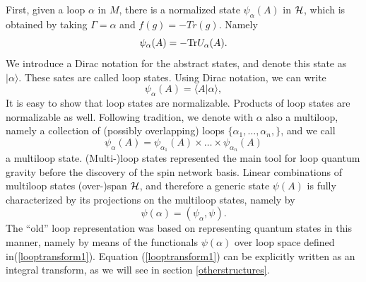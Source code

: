 \documentclass[12pt]{article}
\begin{document}
First, given a loop $\alpha$ in $M$, there is a normalized state 
$\psi_{\alpha}(A)$ in $\cal H$, which is obtained by taking 
$\Gamma=\alpha$ and $f(g)=-Tr(g)$.  Namely
\begin{equation}
	\psi_{\alpha}(A) = - {\rm Tr} U_{\alpha}(A). 
\end{equation}
We introduce a Dirac notation for the abstract states, and 
denote this state as $|\alpha\rangle$.  These sates are called 
loop states. Using Dirac notation, we can write
\begin{equation}
	\psi_{\alpha}(A) = \langle A |\alpha\rangle,
\end{equation}
It is easy to show that loop states are normalizable.  Products 
of loop states are normalizable as well.  Following tradition, we 
denote with $\alpha$ also a multiloop, namely a collection of 
(possibly overlapping) loops $\{\alpha_{1},\ldots,\alpha_{n},\}$, 
and we call 
\begin{equation}
	\psi_{\alpha}(A)=\psi_{\alpha_{1}}(A)\times \ldots \times 	
	\psi_{\alpha_{n}}(A)
\end{equation}
a multiloop state.  (Multi-)loop states represented the main tool 
for loop quantum gravity before the discovery of the spin network 
basis.  Linear combinations of multiloop states (over-)span $\cal 
H$, and therefore a generic state $\psi(A)$ is fully 
characterized by its projections on the multiloop states, namely 
by
\begin{equation}
	\psi(\alpha) = (\psi_{\alpha},\psi).
	\label{looptransform1}
\end{equation}
The ``old'' loop representation was based on representing quantum 
states in this manner, namely by means of the functionals 
$\psi(\alpha)$ over loop space defined in(\ref{looptransform1}).  
Equation (\ref{looptransform1}) can be explicitly written as an 
integral transform, as we will see in section \ref{otherstructures}. 
\end{document}
